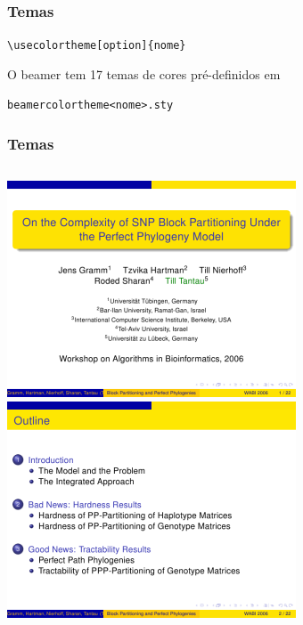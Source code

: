 \documentclass{beamer}
\newcommand{\kw}[1]{\textbackslash {\color{submerged}#1}}
\begin{document}
\begin{frame}
   \frametitle{Temas}
   \begin{center}
      {\tt{\kw{usecolortheme}[option]\{nome\}}}\\
   \end{center}
   O beamer tem 17 temas de cores pré-definidos em\\
   \begin{center}{\tt{beamercolortheme<nome>.sty}}\end{center}
\end{frame}

\begin{frame}
   \frametitle{Temas}
   \begin{columns}
      \includegraphics[width=0.45\paperwidth]{imagens/AnnArbor01.png}
      \includegraphics[width=0.45\paperwidth]{imagens/AnnArbor02.png}
   \end{columns}
\end{frame}
\end{document}
